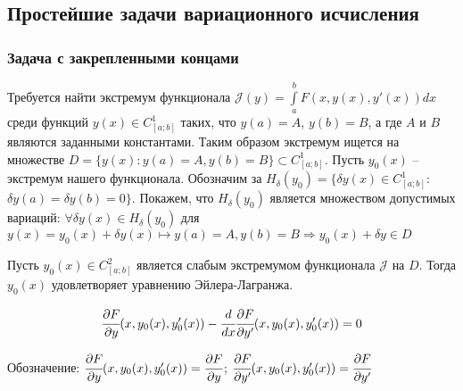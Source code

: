     \subsection{Простейшие задачи вариационного исчисления}
    \subsubsection{Задача с закрепленными концами}
    
    Требуется найти экстремум функционала $\mathcal{J} (y) = \int \limits^b_a F(x, y(x), y'(x)) dx$ среди функций $y(x) \in C^1_{[a;b]}$ таких, что $y(a) = A$, $y(b) = B$, а где $A$ и $B$ являются заданными константами.
    Таким образом экстремум ищется на множестве $D = \{y(x): y(a) = A, y(b) = B\} \subset C^1_{[a;b]}$. Пусть $y_0(x)$ -- экстремум нашего функционала.  
    Обозначим за $H_{\delta}(y_0) = \{ \delta y(x) \in C^1_{[a;b]}$: $\delta y(a) = \delta y(b) = 0 \}$.
    Покажем, что $H_{\delta}(y_0)$ является множеством допустимых вариаций: $\forall \delta y(x) \in H_{\delta}(y_0)$ для $y(x) = y_0(x) + \delta y(x) \mapsto y(a) = A, y(b) = B \Rightarrow y_0(x) + \delta y \in D$
    
    \begin{theorem}
    	Пусть $y_0(x) \in C^2_{[a;b]}$ является слабым экстремумом функционала $\mathcal{J}$ на $D$. Тогда $y_0(x)$ удовлетворяет уравнению Эйлера-Лагранжа.
    	
    	\begin{equation} \label{issue15:IF}
    		\cfrac{\partial F}{\partial y}(x, y_0(x), y'_0(x)) - \cfrac{d}{dx} \cfrac{\partial F}{\partial y'} (x, y_0(x), y'_0(x)) = 0
    	\end{equation}
    	
    	Обозначение: $\cfrac{\partial F}{\partial y}(x, y_0(x), y'_0(x)) = \cfrac{\partial F}{\partial y}$; $\cfrac{\partial F}{\partial y'} (x, y_0(x), y'_0(x)) = \cfrac{\partial F}{\partial y'}$
    	
    \end{theorem}
    
